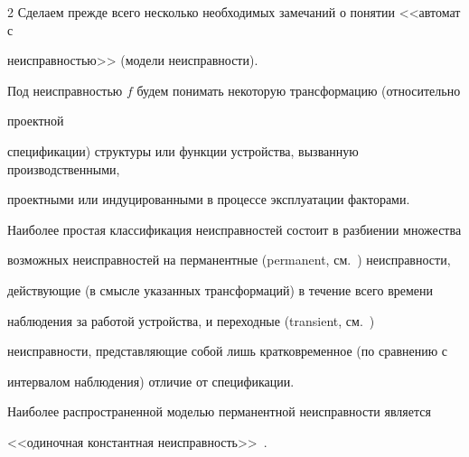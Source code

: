 \begin{multicols}{2}
 Сделаем прежде всего несколько необходимых замечаний о понятии <<автомат с


неисправностью>> (модели неисправности).


Под неисправностью $f$ будем понимать некоторую трансформацию (относительно


проектной


спецификации) структуры или функции устройства, вызванную производственными,


проектными или индуцированными в процессе эксплуатации факторами.





 Наиболее простая классификация неисправностей состоит в разбиении множества


возможных неисправностей на перманентные (permanent, см.~\cite{1}) неисправности,


действующие (в смысле указанных трансформаций) в течение всего времени


наблюдения за работой устройства, и переходные (transient, см.~\cite{1, 3})


неисправности, представляющие собой лишь кратковременное (по сравнению с


интервалом наблюдения) отличие от спецификации.





 Наиболее распространенной моделью перманентной неисправности является


<<одиночная \mbox{константная} неисправность>>~\cite{8, 9}.


\begin{table}[b]\small %


\vspace*{6pt}


\begin{center}


\parbox{272pt}{


}





\vspace*{2ex}





\tabcolsep=7pt


\begin{tabular}{|c|c|c|c|c|c|c|}



\end{tabular}
\end{center}
\end{table}
\end{multicols}
